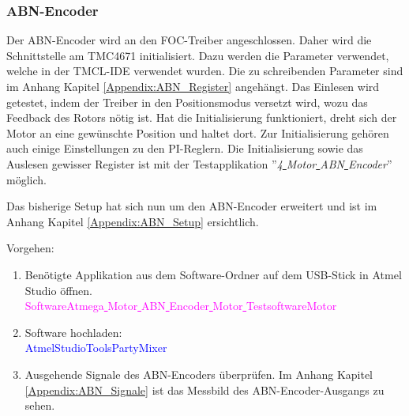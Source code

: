 \newpage
\subsubsection{ABN-Encoder}
\label{subsubsec:Inbetriebnahme_ABN-Encoder}

Der ABN-Encoder wird an den FOC-Treiber angeschlossen. Daher wird die Schnittstelle am TMC4671 initialisiert. Dazu werden die Parameter verwendet, welche in der TMCL-IDE verwendet wurden. Die zu schreibenden Parameter sind im Anhang Kapitel \ref{Appendix:ABN_Register} angehängt. Das Einlesen wird getestet, indem der Treiber in den Positionsmodus versetzt wird, wozu das Feedback des Rotors nötig ist. Hat die Initialisierung funktioniert, dreht sich der Motor an eine gewünschte Position und haltet dort. Zur Initialisierung gehören auch einige Einstellungen zu den PI-Reglern. Die Initialisierung sowie das Auslesen gewisser Register ist mit der Testapplikation ''\textit{4\underline{ }Motor\underline{ }ABN\underline{ }Encoder}'' möglich.

Das bisherige Setup hat sich nun um den ABN-Encoder erweitert und ist im Anhang Kapitel \ref{Appendix:ABN_Setup} ersichtlich.

Vorgehen:
\begin{enumerate}
\item Benötigte Applikation aus dem Software-Ordner auf dem USB-Stick in Atmel Studio öffnen.\\
\textcolor{magenta}{Software\textrightarrow Atmega\underline{ }Motor\underline{ }ABN\underline{ }Encoder\underline{ }Motor\underline{ }Testsoftware\textrightarrow Motor}\\

\item Software hochladen:\\
\textcolor{blue}{AtmelStudio\textrightarrow Tools\textrightarrow PartyMixer}\\


\item Ausgehende Signale des ABN-Encoders überprüfen. Im Anhang Kapitel \ref{Appendix:ABN_Signale} ist das Messbild des ABN-Encoder-Ausgangs zu sehen.

\end{enumerate}